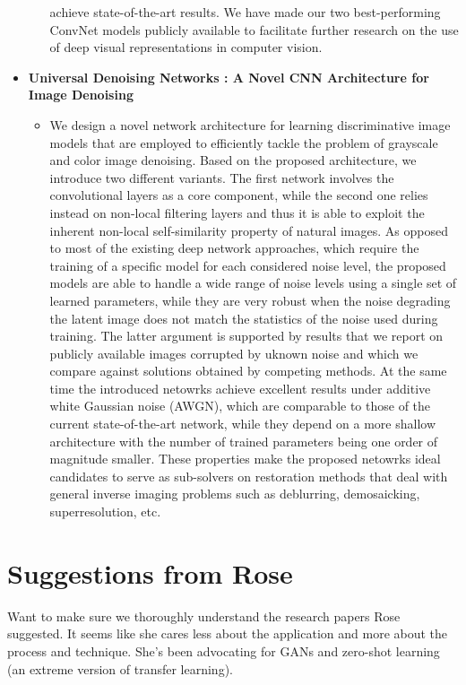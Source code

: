 \documentclass[12pt]{article}
\begin{document}
\begin{itemize}
\begin{itemize}
    achieve state-of-the-art results. We have made our two best-performing
    ConvNet models publicly available to facilitate further research on the
    use of deep visual representations in computer vision.
  \end{itemize}
\item \textbf{Universal Denoising Networks : A Novel CNN Architecture for
  Image Denoising} \cite{DBLP:journals/corr/abs-1711-07807}
  \begin{itemize}
  \item We design a novel network architecture for learning discriminative
    image models that are employed to efficiently tackle the problem of
    grayscale and color image denoising. Based on the proposed architecture,
    we introduce two different variants. The first network involves the
    convolutional layers as a core component, while the second one relies
    instead on non-local filtering layers and thus it is able to exploit the
    inherent non-local self-similarity property of natural images. As
    opposed to most of the existing deep network approaches, which require the
    training of a specific model for each considered noise level, the
    proposed models are able to handle a wide range of noise levels using a
    single set of learned parameters, while they are very robust when the
    noise degrading the latent image does not match the statistics of the noise
    used during training. The latter argument is supported by results that we
    report on publicly available images corrupted by uknown noise and which we
    compare against solutions obtained by competing methods. At the same
    time the introduced netowrks achieve excellent results under additive white
    Gaussian noise (AWGN), which are comparable to those of the current
    state-of-the-art network, while they depend on a more shallow architecture
    with the number of trained parameters being one order of magnitude
    smaller. These properties make the proposed netowrks ideal candidates to
    serve as sub-solvers on restoration methods that deal with general
    inverse imaging problems such as deblurring, demosaicking, superresolution,
    etc.
  \end{itemize}
\end{itemize}

\section{Suggestions from Rose}

Want to make sure we thoroughly understand the research papers
Rose suggested. It seems like she cares less about the application
and more about the process and technique. She's been advocating for
GANs and zero-shot learning (an extreme version of transfer learning).
\end{document}

